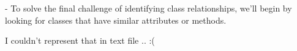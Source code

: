 - To solve the final challenge of identifying class relationships, we'll begin by looking for classes that have similar attributes or methods.

I couldn't represent that in text file ..  :(